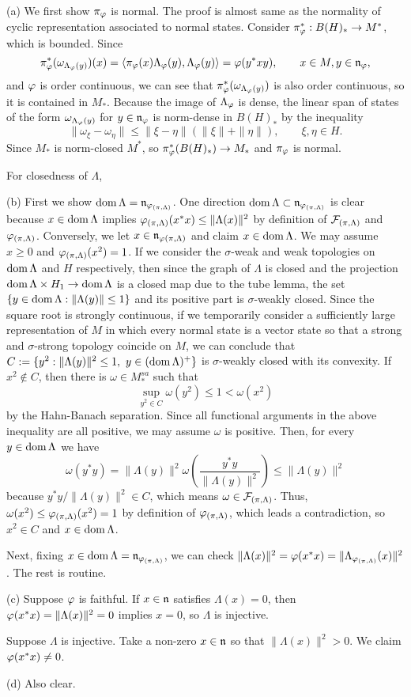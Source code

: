 \documentclass{../../../small}
\begin{document}
\begin{pf}
(a)
We first show $\pi_\varphi$ is normal.
The proof is almost same as the normality of cyclic representation associated to normal states.
Consider $\pi_\varphi^*:B(H)_*\to M^*$, which is bounded.
Since
\[\pi_\varphi^*(\omega_{\Lambda_\varphi(y)})(x)=\langle\pi_\varphi(x)\Lambda_\varphi(y),\Lambda_\varphi(y)\rangle=\varphi(y^*xy),\qquad x\in M, y\in\mathfrak{n}_\varphi,\]
and $\varphi$ is order continuous, we can see that $\pi_\varphi^*(\omega_{\Lambda_\varphi(y)})$ is also order continuous, so it is contained in $M_*$.
Because the image of $\Lambda_\varphi$ is dense, the linear span of states of the form $\omega_{\Lambda_\varphi(y)}$ for $y\in\mathfrak{n}_\varphi$ is norm-dense in $B(H)_*$ by the inequality
\[\|\omega_\xi-\omega_\eta\|\le\|\xi-\eta\|(\|\xi\|+\|\eta\|),\qquad\xi,\eta\in H.\]
Since $M_*$ is norm-closed $M^*$, so $\pi_\varphi^*(B(H)_*)\to M_*$ and $\pi_\varphi$ is normal.

For closedness of $\Lambda$,



(b)
First we show $\operatorname{dom}\Lambda=\mathfrak{n}_{\varphi_{(\pi,\Lambda)}}$.
One direction $\operatorname{dom}\Lambda\subset\mathfrak{n}_{\varphi_{(\pi,\Lambda)}}$ is clear because $x\in\operatorname{dom}\Lambda$ implies $\varphi_{(\pi,\Lambda)}(x^*x)\le\|\Lambda(x)\|^2$ by definition of $\mathcal{F}_{(\pi,\Lambda)}$ and $\varphi_{(\pi,\Lambda)}$.
Conversely, we let $x\in\mathfrak{n}_{\varphi(\pi,\Lambda)}$ and claim $x\in\operatorname{dom}\Lambda$.
We may assume $x\ge0$ and $\varphi_{(\pi,\Lambda)}(x^2)=1$.
If we consider the $\sigma$-weak and weak topologies on $\operatorname{dom}\Lambda$ and $H$ respectively, then since the graph of $\Lambda$ is closed and the projection $\operatorname{dom}\Lambda\times H_1\to\operatorname{dom}\Lambda$ is a closed map due to the tube lemma, the set $\{y\in\operatorname{dom}\Lambda:\|\Lambda(y)\|\le1\}$ and its positive part is $\sigma$-weakly closed.
Since the square root is strongly continuous, if we temporarily consider a sufficiently large representation of $M$ in which every normal state is a vector state so that a strong and $\sigma$-strong topology coincide on $M$, we can conclude that $C:=\{y^2:\|\Lambda(y)\|^2\le1,\ y\in(\dom\Lambda)^+\}$ is $\sigma$-weakly closed with its convexity.
If $x^2\notin C$, then there is $\omega\in M_*^{sa}$ such that
\[\sup_{y^2\in C}\omega(y^2)\le1<\omega(x^2)\]
by the Hahn-Banach separation.
Since all functional arguments in the above inequality are all positive, we may assume $\omega$ is positive.
Then, for every $y\in\operatorname{dom}\Lambda$ we have
\[\omega(y^*y)=\|\Lambda(y)\|^2\omega(\frac{y^*y}{\|\Lambda(y)\|^2})\le\|\Lambda(y)\|^2\]
because $y^*y/\|\Lambda(y)\|^2\in C$, which means $\omega\in\mathcal{F}_{(\pi,\Lambda)}$.
Thus, $\omega(x^2)\le\varphi_{(\pi,\Lambda)}(x^2)=1$ by definition of $\varphi_{(\pi,\Lambda)}$, which leads a contradiction, so $x^2\in C$ and $x\in\operatorname{dom}\Lambda$.


Next, fixing $x\in\operatorname{dom}\Lambda=\mathfrak{n}_{\varphi_{(\pi,\Lambda)}}$, we can check $\|\Lambda(x)\|^2=\varphi(x^*x)=\|\Lambda_{\varphi_{(\pi,\Lambda)}}(x)\|^2$.
The rest is routine.

(c)
Suppose $\varphi$ is faithful.
If $x\in\mathfrak{n}$ satisfies $\Lambda(x)=0$, then $\varphi(x^*x)=\|\Lambda(x)\|^2=0$ implies $x=0$, so $\Lambda$ is injective.

Suppose $\Lambda$ is injective.
Take a non-zero $x\in\mathfrak{n}$ so that $\|\Lambda(x)\|^2>0$.
We claim $\varphi(x^*x)\ne0$.

(d)
Also clear.
\end{pf}
\end{document}
